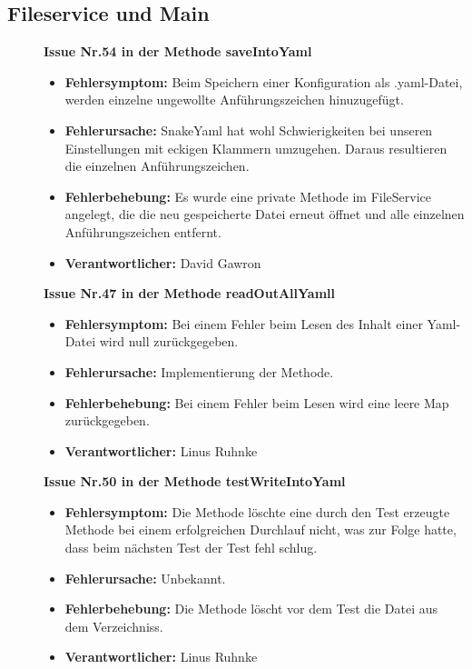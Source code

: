 \documentclass[parskip=full]{scrartcl}
\begin{document}
\subsection{Fileservice und Main}
\begin{description}

\item []\textbf{Issue Nr.54 in der Methode saveIntoYaml} 

\begin{itemize}
\item []\textbf{Fehlersymptom:} Beim Speichern einer Konfiguration als .yaml-Datei, werden einzelne ungewollte Anführungszeichen hinuzugefügt.
\item []\textbf{Fehlerursache:} SnakeYaml hat wohl Schwierigkeiten bei unseren Einstellungen mit eckigen Klammern umzugehen. Daraus resultieren die einzelnen Anführungszeichen.
\item []\textbf{Fehlerbehebung:} Es wurde eine private Methode im FileService angelegt, die die neu gespeicherte Datei erneut öffnet und alle einzelnen Anführungszeichen entfernt.
\item []\textbf{Verantwortlicher:} David Gawron
\end{itemize}



\item []\textbf{Issue Nr.47 in der Methode readOutAllYamll} 

\begin{itemize}
\item []\textbf{Fehlersymptom:} Bei einem Fehler beim Lesen des Inhalt einer Yaml-Datei wird null zurückgegeben.
\item []\textbf{Fehlerursache:} Implementierung der Methode.
\item []\textbf{Fehlerbehebung:} Bei einem Fehler beim Lesen wird eine leere Map zurückgegeben.
\item []\textbf{Verantwortlicher:} Linus Ruhnke
\end{itemize}

\item []\textbf{Issue Nr.50 in der Methode testWriteIntoYaml} 

\begin{itemize}
\item []\textbf{Fehlersymptom:} Die Methode löschte eine durch den Test erzeugte Methode bei einem erfolgreichen Durchlauf nicht, was zur Folge hatte, dass beim nächsten Test der Test fehl schlug.
\item []\textbf{Fehlerursache:} Unbekannt.
\item []\textbf{Fehlerbehebung:} Die Methode löscht vor dem Test die Datei aus dem Verzeichniss.
\item []\textbf{Verantwortlicher:} Linus Ruhnke
\end{itemize}


\end{description}
\end{document}

